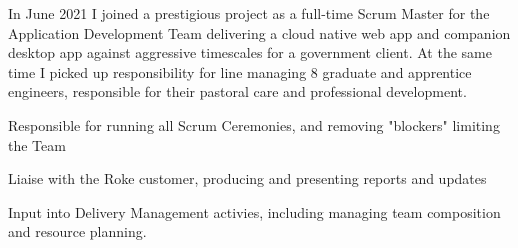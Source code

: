 \sectionsep
{}
\vspace{0.5em}
In June 2021 I joined a prestigious project as a full-time Scrum Master for the Application Development Team delivering a cloud native web app and companion desktop app against aggressive timescales for a government client.
At the same time I picked up responsibility for line managing 8 graduate and apprentice engineers, responsible for their pastoral care and professional development.
\vspace{0.25em}
\begin{tightemize}
  \item Responsible for running all Scrum Ceremonies, and removing "blockers" limiting the Team
  \item Liaise with the Roke customer, producing and presenting reports and updates
  \item Input into Delivery Management activies, including managing team composition and resource planning.
\end{tightemize}
\sectionsep
